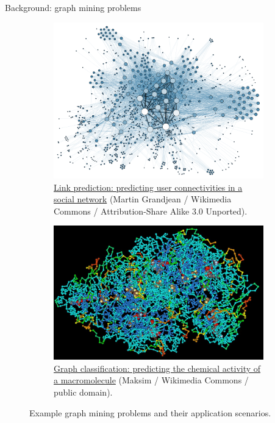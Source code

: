 \documentclass{beamer}
\begin{document}
\begin{frame}{Background: graph mining problems}
	\begin{figure}[H]
		\centering
		\begin{subfigure}{0.49\textwidth}
			\includegraphics[width=\linewidth]{Social_Network_Analysis_Visualization}
			\caption{
				\href{https://commons.wikimedia.org/wiki/File:Social_Network_Analysis_Visualization.png}{Link prediction: predicting user connectivities in a social network} (Martin Grandjean / Wikimedia Commons / Attribution-Share Alike 3.0 Unported).
			}
			\label{fig:Social_Network_Analysis_Visualization}
		\end{subfigure}
		\begin{subfigure}{0.49\textwidth}
			\includegraphics[width=\textwidth]{ProteinStructure}
			\caption{
				\href{https://commons.wikimedia.org/wiki/File:ProteinStructure.jpg}
				{Graph classification: predicting the chemical activity of a macromolecule} (Maksim / Wikimedia Commons / public domain).
			}
			\label{fig:protein}
		\end{subfigure}
		\caption{
			Example graph mining problems and their application scenarios.
		}
		\label{fig:trainnig}
	\end{figure}
\end{frame}
\end{document}

